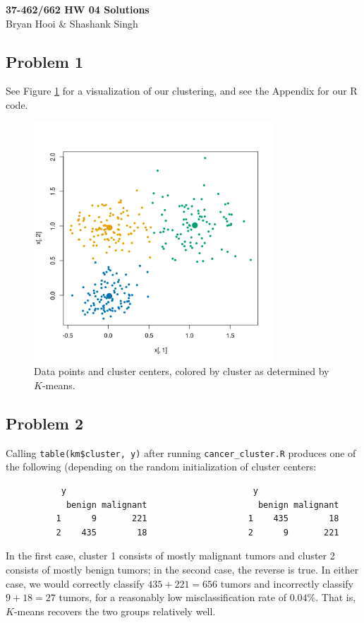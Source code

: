\documentclass[12pt]{article}
\begin{document}
\begin{center}
{\bf\Large 37-462/662 HW 04 Solutions}\\
Bryan Hooi \& Shashank Singh\\
\end{center}


\subsection*{Problem 1}
See Figure \ref{fig:p1} for a visualization of our clustering, and see the
Appendix for our R code.
\begin{figure}[h!]
\centering
\includegraphics[width=0.8\textwidth]{p1}
\vspace{-2mm}
\caption{Data points and cluster centers, colored by cluster as determined by
$K$-means.}
\label{fig:p1}
\end{figure}

\newpage
\subsection*{Problem 2}
Calling \texttt{table(km\$cluster, y)} after running \texttt{cancer\_cluster.R}
produces one of the following (depending on the random initialization of
cluster centers:
\begin{verbatim}
           y                                     y
            benign malignant                      benign malignant
          1      9       221                    1    435        18
          2    435        18                    2      9       221
\end{verbatim}
In the first case, cluster 1 consists of mostly malignant tumors and cluster 2
consists of mostly benign tumors; in the second case, the reverse is true. In
either case, we would correctly classify $435 + 221 = 656$ tumors and
incorrectly classify $9 + 18 = 27$ tumors, for a reasonably low
misclassification rate of $0.04\%$. That is, $K$-means recovers the two groups
relatively well.
\end{document}
